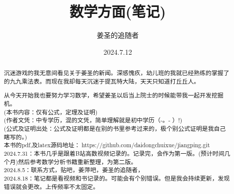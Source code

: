 \title{数学方面(笔记)} %
\author{姜圣的追随者}  %
\date{2024.7.12} %

\maketitle %
\newpage
\begin{abstract}
    沉迷游戏的我无意间看见关于姜圣的新闻。深感愧疚，幼儿班的我就已经熟练的掌握了的九九乘法表。而现在我却每天沉迷于提瓦特大陆，天天只知道打丘丘人。\par 从今天开始我也要努力学习数学，希望姜圣以后当上院士的时候能带我一起开发挖掘机。
    \\(本书内容：仅有公式，定理及证明)
    \\(作者文凭：中专学历，混的文凭，简单理解就是初中学历（-。- ）!)
    \\(公式及证明出处：公式及证明都是在别的书里参考过来的，极个别公式证明是我自己瞎写的。)
    \\本书的pdf,及latex源码地址：\faGithub $\ $https://github.com/daidongchuixue/jiangping.git
    \\2024.7.31：本书几乎是跟着B站高数视频记录的。记录完，会作为第一版。(预计时间几个月)然后参考数学分析书籍重新整理，为第二版。
    \\2024.8.5：联系方式，贴吧，姜萍吧，姜圣的追随者，
    \\2024.8.18：笔记都是看视频和书记录的。可能会有个别错误。但是我会持续更新，发现错误就会更改。上传频率不太固定。
\end{abstract}
\newpage
\renewcommand{\contentsname}{\begin{center}目录\end{center} }
\tableofcontents %


